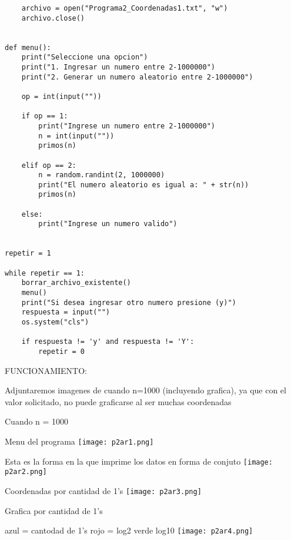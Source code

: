 \documentclass{article}
\begin{document}
\begin{flushleft}
\begin{lstlisting}
    archivo = open("Programa2_Coordenadas1.txt", "w")
    archivo.close()
        

def menu():
    print("Seleccione una opcion")
    print("1. Ingresar un numero entre 2-1000000")
    print("2. Generar un numero aleatorio entre 2-1000000")

    op = int(input(""))

    if op == 1:
        print("Ingrese un numero entre 2-1000000")
        n = int(input(""))
        primos(n)
        
    elif op == 2:
        n = random.randint(2, 1000000)
        print("El numero aleatorio es igual a: " + str(n))
        primos(n)
        
    else:
        print("Ingrese un numero valido")


repetir = 1

while repetir == 1:
    borrar_archivo_existente()
    menu()
    print("Si desea ingresar otro numero presione (y)")
    respuesta = input("")
    os.system("cls")
    
    if respuesta != 'y' and respuesta != 'Y':
        repetir = 0

\end{lstlisting}

FUNCIONAMIENTO:

Adjuntaremos imagenes de cuando n=1000 (incluyendo grafica), ya que con el valor solicitado, no puede graficarse al ser muchas coordenadas

Cuando n = 1000

Menu del programa
\texttt{[image: p2ar1.png]}

Esta es la forma en la que imprime los datos en forma de conjuto
\texttt{[image: p2ar2.png]}

Coordenadas por cantidad de 1's
\texttt{[image: p2ar3.png]}

Grafica por cantidad de 1's

azul = cantodad de 1's
rojo = log2
verde log10
\texttt{[image: p2ar4.png]}


\end{flushleft}
\end{document}
